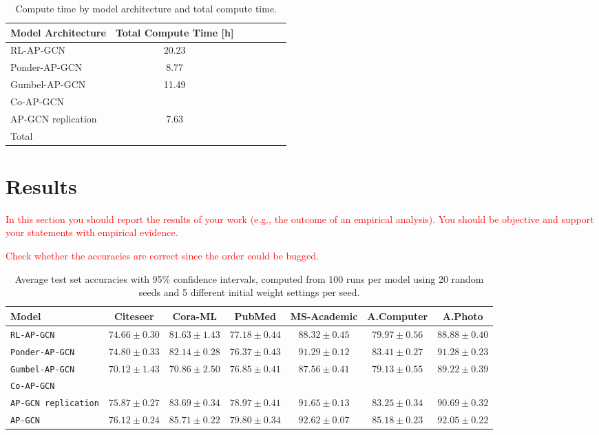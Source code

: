 \documentclass{gdl}
\begin{document}
\begin{table}[h]
    \small\sf
    \setlength{\tabcolsep}{2pt}
    \caption{Compute time by model architecture and total compute time.}
    \begin{tabular}{l c c c c c c}
        \toprule
        Model Architecture & Total Compute Time [h]\\
        \midrule
        RL-AP-GCN & 20.23 \\
        Ponder-AP-GCN & 8.77 \\
        Gumbel-AP-GCN & 11.49 \\
        Co-AP-GCN &  \\
        AP-GCN replication & 7.63  \\
        \midrule
        Total &  \\
        \bottomrule
    \end{tabular}
    \label{tab:total-compute-time}
\end{table}


\section{Results}

\textcolor{red}{In this section you should report the results of your work (e.g., the outcome of an empirical analysis). You should be objective and support your statements with empirical evidence.}

\textcolor{red}{Check whether the accuracies are correct since the order could be bugged.}
\begin{table}[h]
    \small\sf\centering
    \caption{Average test set accuracies with 95\% confidence intervals, computed from 100 runs per model using 20 random seeds and 5 different initial weight settings per seed.}
    \begin{tabular}{l c c c c c c}
        \toprule
        Model & Citeseer & Cora-ML & PubMed & MS-Academic & A.Computer & A.Photo\\
        \midrule
        \texttt{RL-AP-GCN} &$74.66 \pm 0.30$&$81.63 \pm 1.43$&$77.18 \pm 0.44$&$88.32 \pm 0.45$&$79.97 \pm 0.56$&$88.88 \pm 0.40$   \\
        \texttt{Ponder-AP-GCN} &$74.80 \pm 0.33$&$82.14 \pm 0.28$&$76.37 \pm 0.43$&$91.29 \pm 0.12$&$83.41 \pm 0.27$&$91.28 \pm 0.23$  \\
        \texttt{Gumbel-AP-GCN} &$70.12 \pm 1.43$&$70.86 \pm 2.50$&$76.85 \pm 0.41$&$87.56 \pm 0.41$&$79.13 \pm 0.55$&$89.22 \pm 0.39$  \\
        \texttt{Co-AP-GCN}  \\
        \texttt{AP-GCN replication} &$75.87 \pm 0.27$&$83.69 \pm 0.34$&$78.97 \pm 0.41$&$91.65 \pm 0.13$&$83.25 \pm 0.34$&$90.69 \pm 0.32$        \\
        \midrule
        \texttt{AP-GCN} & $76.12 \pm 0.24$ & $85.71 \pm 0.22$ & $79.80 \pm 0.34$ & $92.62 \pm 0.07$ & $85.18 \pm 0.23$ & $92.05 \pm 0.22$\\
        \bottomrule
    \end{tabular}
    \label{tab:accuracy}
\end{table}
\end{document}
